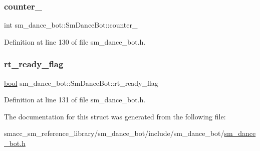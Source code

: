 \subsubsection{\texorpdfstring{counter\+\_}{counter\_1}}
{\footnotesize\ttfamily int sm\+\_\+dance\+\_\+bot\+::\+Sm\+Dance\+Bot\+::counter\+\_}



Definition at line 130 of file sm\+\_\+dance\+\_\+bot.\+h.

\mbox{\label{structsm__dance__bot_1_1SmDanceBot_a0f0587a13670ad8925555cd8f6cb6b2d}} 
\subsubsection{\texorpdfstring{rt\+\_\+ready\+\_\+flag}{rt\_ready\_flag}}
{\footnotesize\ttfamily \hyperlink{classbool}{bool} sm\+\_\+dance\+\_\+bot\+::\+Sm\+Dance\+Bot\+::rt\+\_\+ready\+\_\+flag}



Definition at line 131 of file sm\+\_\+dance\+\_\+bot.\+h.



The documentation for this struct was generated from the following file\+:\begin{DoxyCompactItemize}
\item 
smacc\+\_\+sm\+\_\+reference\+\_\+library/sm\+\_\+dance\+\_\+bot/include/sm\+\_\+dance\+\_\+bot/\hyperlink{sm__dance__bot_8h}{sm\+\_\+dance\+\_\+bot.\+h}\end{DoxyCompactItemize}
